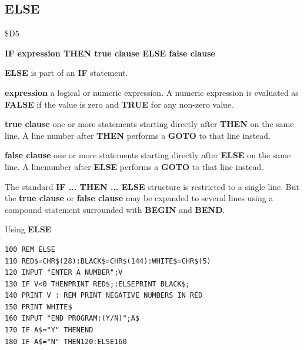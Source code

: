 \subsection{ELSE}
\begin{description}[leftmargin=2cm,style=nextline]
\item [Token:] \$D5
\item [Format:] {\bf IF expression THEN true clause ELSE false clause}
\item [Usage:] {\bf ELSE} is part of an {\bf IF}
               statement.

               {\bf expression} a logical or numeric expression.
               A numeric expression is evaluated as {\bf FALSE}
               if the value is zero and {\bf TRUE} for any non-zero
               value.

               {\bf true clause} one or more statements starting
               directly after {\bf THEN} on the same line.
               A line number after {\bf THEN} performs a
               {\bf GOTO} to that line instead.

               {\bf false clause} one or more statements starting
               directly after {\bf ELSE} on the same line.
               A linenumber after {\bf ELSE} performs a
               {\bf GOTO} to that line instead.

\item [Remarks:]
               The standard {\bf IF ... THEN ... ELSE} structure
               is restricted to a single line. But the {\bf true clause}
               or {\bf false clause} may be expanded to several lines
               using a compound statement surrounded with
               {\bf BEGIN} and {\bf BEND}.
\item [Example:]
                Using {\bf ELSE}
\begin{tcolorbox}[colback=black,coltext=white]
\verbatimfont{\codefont}
\begin{verbatim}
100 REM ELSE
110 RED$=CHR$(28):BLACK$=CHR$(144):WHITE$=CHR$(5)
120 INPUT "ENTER A NUMBER";V
130 IF V<0 THENPRINT RED$;:ELSEPRINT BLACK$;
140 PRINT V : REM PRINT NEGATIVE NUMBERS IN RED
150 PRINT WHITE$
160 INPUT "END PROGRAM:(Y/N)";A$
170 IF A$="Y" THENEND
180 IF A$="N" THEN120:ELSE160
\end{verbatim}
\end{tcolorbox}
\end{description}




